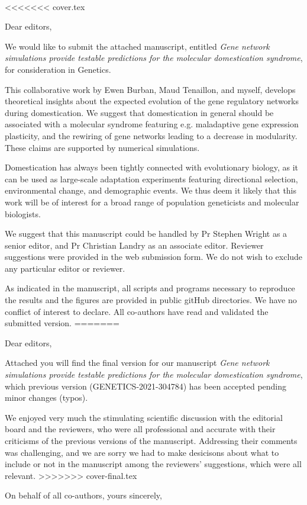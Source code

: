 \documentclass[12pt]{lettre}
\begin{document}

\begin{letter}{~}

\nodate
\nolieu

\def\concname{Subject:~}
<<<<<<< cover.tex

\opening{Dear editors, }


We would like to submit the attached manuscript, entitled \emph{Gene network simulations provide testable predictions for the
molecular domestication syndrome}, for consideration in Genetics. 

This collaborative work by Ewen Burban, Maud Tenaillon, and myself, develops theoretical insights about the expected evolution of the gene regulatory networks during domestication. We suggest that domestication in general should be associated with a molecular syndrome featuring e.g. maladaptive gene expression plasticity, and the rewiring of gene networks leading to a decrease in modularity. These claims are supported by numerical simulations. 

Domestication has always been tightly connected with evolutionary biology, as it can be used as large-scale adaptation experiments featuring directional selection, environmental change, and demographic events.  We thus deem it likely that this work will be of interest for a broad range of population geneticists and molecular biologists. 

We suggest that this manuscript could be handled by Pr Stephen Wright as a senior editor, and Pr Christian Landry as an associate editor. Reviewer suggestions were provided in the web submission form. We do not wish to exclude any particular editor or reviewer. 

As indicated in the manuscript, all scripts and programs necessary to reproduce the results and the figures are provided in public gitHub directories. We have no conflict of interest to declare. All co-authors have read and validated the submitted version. 
=======

\opening{Dear editors, }

Attached you will find the final version for our manuscript \emph{Gene network simulations provide testable predictions for the
molecular domestication syndrome}, which previous version (GENETICS-2021-304784) has been accepted pending minor changes (typos). 

We enjoyed very much the stimulating scientific discussion with the editorial board and the reviewers, who were all professional and accurate with their criticisms of the previous versions of the manuscript. Addressing their comments was challenging, and we are sorry we had to make desicisons about what to include or not in the manuscript among the reviewers' suggestions, which were all relevant. 
>>>>>>> cover-final.tex

\closing{On behalf of all co-authors, yours sincerely,}

\end{letter}
\end{document}
